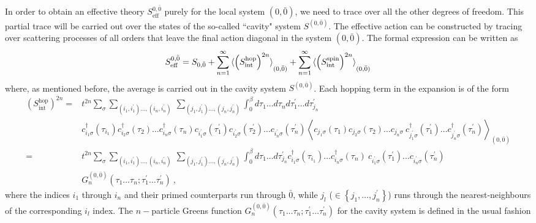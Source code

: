 \documentclass[reprint,hidelinks,onecolumn]{revtex4-2}
\begin{document}
In order to obtain an effective theory \(S^{0,{\bar 0}}_\text{eff}\) purely for the local system \((0,{\bar 0})\), we need to trace over all the other degrees of freedom. This partial trace will be carried out over the states of the so-called ``cavity" system \(S^{(0,{\bar 0})}\). The effective action can be constructed by tracing over scattering processes of all orders that leave the final action diagonal in the system \((0,{\bar 0})\). The formal expression can be written as
\begin{equation}\begin{aligned}
	S^{0,{\bar 0}}_\text{eff} = S_{0,{\bar 0}} + \sum_{n=1}^\infty \braket{\left(S_\text{int}^\text{hop}\right)^{2n}}_{(0,{\bar 0})} + \sum_{n=1}^\infty \braket{\left(S_\text{int}^\text{spin}\right)^{2n}}_{(0,{\bar 0})}
\end{aligned}\end{equation}
where, as mentioned before, the average is carried out in the cavity system \(S^{(0,{\bar 0})}\). Each hopping term in the expansion is of the form
\begin{equation}\begin{aligned}
	\left(S_\text{int}^\text{hop}\right)^{2n} =& t^{2n}\sum_\sigma\sum_{(i_1, i_1^\prime)\ldots, (i_n, i_n^\prime)} ~\sum_{(j_1, j_1^\prime)\ldots, (j_n, j_n^\prime)} \int_0^\beta d\tau_{1}\ldots d\tau_{n}d\tau_{1}^\prime\ldots d\tau_{j_n}^\prime\\
			   &c^\dagger_{i_1\sigma}(\tau_{i_1})c^\dagger_{i_2\sigma}(\tau_{2})\ldots c^\dagger_{i_n\sigma}(\tau_{n}) c_{i_1^\prime\sigma}(\tau_{1}^\prime)c_{i_2^\prime\sigma}(\tau_{2}^\prime)\ldots c_{i_n^\prime\sigma}(\tau_{n}^\prime)\left<c_{j_1\sigma}(\tau_{1})c_{j_2\sigma}(\tau_{2})\ldots c_{j_n\sigma} ~ c^\dagger_{j_1^\prime\sigma}(\tau_{1}^\prime)\ldots c^\dagger_{j_n^\prime\sigma}(\tau_{n}^\prime) \right>_{(0,{\bar 0})}\\
	=& t^{2n}\sum_\sigma\sum_{(i_1, i_1^\prime)\ldots, (i_n, i_n^\prime)} ~\sum_{(j_1, j_1^\prime)\ldots, (j_n, j_n^\prime)} \int_0^\beta d\tau_{1}\ldots d\tau_{j_n}^\prime c^\dagger_{i_1\sigma}(\tau_{i_1})\ldots c^\dagger_{i_n\sigma}(\tau_{n})~c_{i_1^\prime\sigma}(\tau_{1}^\prime)\ldots c_{i_n^\prime\sigma}(\tau_{n}^\prime)\\
	 &G_n^{(0,\bar 0)}\left(\tau_1\ldots \tau_n; \tau_1^\prime\ldots \tau_n^\prime\right)~,
\end{aligned}\end{equation}
where the indices \(i_1\) through \(i_n\) and their primed counterparts run through \(\bar 0\), while \(j_l\) (\(\in \left\{j_1,\ldots,j_n^\prime\right\}\)) runs through the nearest-neighbours of the corresponding \(i_l\) index. The \(n-\)particle Greens function \(G_n^{(0,\bar 0)}\left(\tau_1\ldots \tau_n; \tau_1^\prime\ldots \tau_n^\prime\right)\) for the cavity system is defined in the usual fashion
\end{document}
